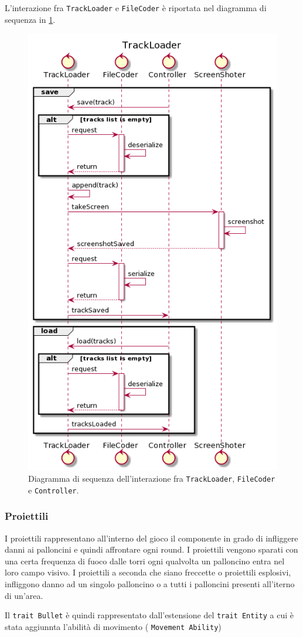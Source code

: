 L'interazione fra \texttt{TrackLoader} e \texttt{FileCoder} è riportata nel diagramma di sequenza in \ref{fig:sequence-track-loader}.


\begin{figure}[H]
    \centering
    \includegraphics[width=.57\linewidth]{img/sequence-track-loader}
    \caption{Diagramma di sequenza dell'interazione fra \texttt{TrackLoader}, \texttt{FileCoder} e \texttt{Controller}.}
    \label{fig:sequence-track-loader}
\end{figure}



\subsubsection{Proiettili}
I proiettili rappresentano all'interno del gioco il componente in grado di infliggere danni ai palloncini e quindi affrontare
ogni round. I proiettili vengono sparati con una certa frequenza di fuoco dalle torri ogni qualvolta un palloncino entra nel
loro campo visivo. I proiettili a seconda che siano freccette o proiettili esplosivi, infliggono danno ad un singolo palloncino
o a tutti i palloncini presenti all'iterno di un'area.

Il \texttt{trait Bullet} è quindi rappresentato dall'estensione del \texttt{trait Entity} a cui è stata aggiunnta
l'abilità di movimento ( \texttt{Movement Ability})

